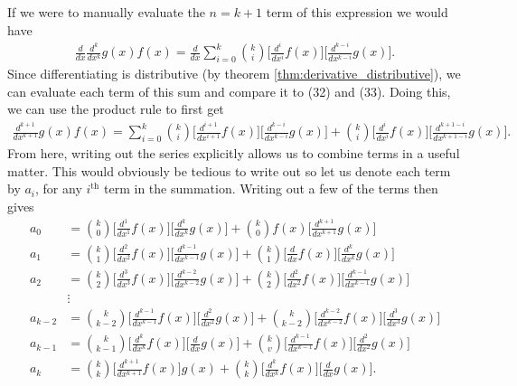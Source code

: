 If we were to manually evaluate the $n=k+1$ term of this expression we would have
\begin{align}
	\frac{d}{dx}\frac{d^{k}}{dx^{k}}g(x)f(x)= \frac{d}{dx}\sum_{i=0}^{k}{{k}\choose{i}}\bigg[\frac{d^i}{dx^i}f(x) \bigg]\bigg[\frac{d^{k-i}}{dx^{k-i}}g(x) \bigg].
\end{align}
Since differentiating is distributive (by theorem \ref{thm:derivative_distributive}), we can evaluate each term of this sum and compare it to (32) and (33). Doing this, we can use the product rule to first get
\begin{align}
	\frac{d^{k+1}}{dx^{k+1}}g(x)f(x)=\sum_{i=0}^{k}{{k}\choose{i}}\bigg[\frac{d^{i+1}}{dx^{i+1}}f(x) \bigg]\bigg[\frac{d^{k-i}}{dx^{k-i}}g(x) \bigg]+{{k}\choose{i}}\bigg[\frac{d^i}{dx^i}f(x) \bigg]\bigg[\frac{d^{k+1-i}}{dx^{k+1-i}}g(x) \bigg]. 
\end{align}
From here, writing out the series explicitly allows us to combine terms in a useful matter. This would obviously be tedious to write out so let us denote each term by $a_i$, for any $i^{\textrm{th}}$ term in the summation. Writing out a few of the terms then gives
\begin{align}
	a_0&={{k}\choose{0}}\bigg[\frac{d^{1}}{dx^{1}}f(x) \bigg]\bigg[\frac{d^{k}}{dx^{k}}g(x) \bigg]+{{k}\choose{0}}f(x)\bigg[\frac{d^{k+1}}{dx^{k+1}}g(x) \bigg] \\
	a_1&={{k}\choose{1}}\bigg[\frac{d^{2}}{dx^{2}}f(x) \bigg]\bigg[\frac{d^{k-1}}{dx^{k-1}}g(x) \bigg]+{{k}\choose{1}}\bigg[\frac{d}{dx}f(x) \bigg]\bigg[\frac{d^{k}}{dx^{k}}g(x) \bigg] \\
	a_2&={{k}\choose{2}}\bigg[\frac{d^{3}}{dx^{3}}f(x) \bigg]\bigg[\frac{d^{k-2}}{dx^{k-2}}g(x) \bigg]+{{k}\choose{2}}\bigg[\frac{d^2}{dx^2}f(x) \bigg]\bigg[\frac{d^{k-1}}{dx^{k-1}}g(x) \bigg]\\
	&\vdots \nonumber\\
	a_{k-2}&={{k}\choose{k-2}}\bigg[\frac{d^{k-1}}{dx^{k-1}}f(x) \bigg]\bigg[\frac{d^{2}}{dx^{2}}g(x) \bigg]+{{k}\choose{k-2}}\bigg[\frac{d^{k-2}}{dx^{k-2}}f(x) \bigg]\bigg[\frac{d^{3}}{dx^{3}}g(x) \bigg]\\
	a_{k-1}&={{k}\choose{k-1}}\bigg[\frac{d^{k}}{dx^{k}}f(x) \bigg]\bigg[\frac{d}{dx}g(x) \bigg]+{{k}\choose{v}}\bigg[\frac{d^{k-1}}{dx^{k-1}}f(x) \bigg]\bigg[\frac{d^{2}}{dx^{2}}g(x) \bigg]\\
	a_k&={{k}\choose{k}}\bigg[\frac{d^{k+1}}{dx^{k+1}}f(x) \bigg]g(x)+{{k}\choose{k}}\bigg[\frac{d^k}{dx^k}f(x) \bigg]\bigg[\frac{d}{dx}g(x) \bigg].
\end{align}
